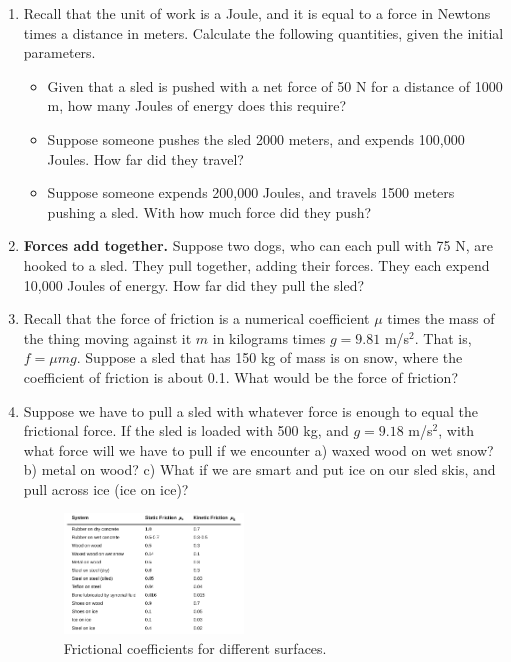 \documentclass[10pt]{article}
\begin{document}
\begin{enumerate}
\item Recall that the unit of work is a Joule, and it is equal to a force in Newtons times a distance in meters.  Calculate the following quantities, given the initial parameters.
\begin{itemize}
\item Given that a sled is pushed with a net force of 50 N for a distance of 1000 m, how many Joules of energy does this require?
\item Suppose someone pushes the sled 2000 meters, and expends 100,000 Joules.  How far did they travel?
\item Suppose someone expends 200,000 Joules, and travels 1500 meters pushing a sled.  With how much force did they push?
\end{itemize} \vspace{3cm}
\item \textbf{Forces add together.}  Suppose two dogs, who can each pull with 75 N, are hooked to a sled.  They pull together, adding their forces.  They each expend 10,000 Joules of energy.  How far did they pull the sled? \vspace{3cm}
\item Recall that the force of friction is a numerical coefficient $\mu$ times the mass of the thing moving against it $m$ in kilograms times $g = 9.81$ m/s$^2$.  That is, $f = \mu m g$.  Suppose a sled that has 150 kg of mass is on snow, where the coefficient of friction is about 0.1.  What would be the force of friction? \vspace{3cm}
\item Suppose we have to pull a sled with whatever force is enough to equal the frictional force.  If the sled is loaded with 500 kg, and $g=9.18$ m/s$^2$, with what force will we have to pull if we encounter a) waxed wood on wet snow? b) metal on wood? c) What if we are smart and put ice on our sled skis, and pull across ice (ice on ice)?
\begin{figure}[hb]
\centering
\includegraphics[width=0.45\textwidth]{friction.png}
\caption{\label{fig:friction} Frictional coefficients for different surfaces.}

\end{figure}
\end{enumerate}
\end{document}
